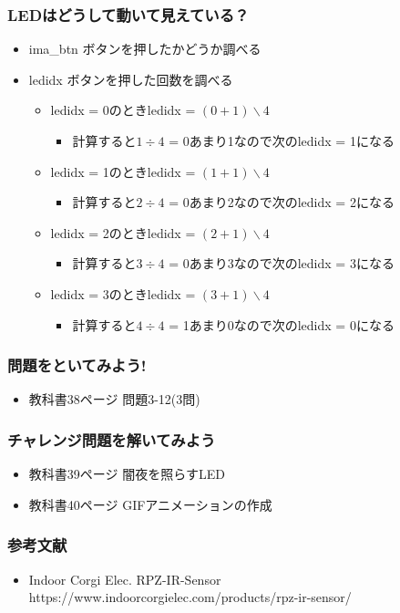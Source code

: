 \begin{frame}
  \frametitle{LEDはどうして動いて見えている？}
  \begin{itemize}
    \item ima\_btn ボタンを押したかどうか調べる
    \item ledidx ボタンを押した回数を調べる
    \begin{itemize}
      \item ledidx = 0のときledidx = $(0+1)\backslash4$
      \begin{itemize}
        \item 計算すると$1\div4$ = 0あまり1なので次のledidx = 1になる
      \end{itemize}
      \item ledidx = 1のときledidx = $(1+1)\backslash4$ 
      \begin{itemize}
        \item 計算すると$2\div4$ = 0あまり2なので次のledidx = 2になる 
      \end{itemize}
      \item ledidx = 2のときledidx = $(2+1)\backslash4$ 
      \begin{itemize}
        \item 計算すると$3\div4$ = 0あまり3なので次のledidx = 3になる
      \end{itemize}
      \item ledidx = 3のときledidx = $(3+1)\backslash4$ 
      \begin{itemize}
        \item 計算すると$4\div4$ = 1あまり0なので次のledidx = 0になる
      \end{itemize}
    \end{itemize}
  \end{itemize}
\end{frame}

\begin{frame}
  \frametitle{問題をといてみよう!}
  \begin{itemize}
    \item 教科書38ページ 問題3-12(3問)
  \end{itemize}
\end{frame}

\begin{frame}
  \frametitle{チャレンジ問題を解いてみよう}
  \begin{itemize}
    \item 教科書39ページ 闇夜を照らすLED
    \item 教科書40ページ GIFアニメーションの作成
  \end{itemize}
\end{frame}

\begin{frame}
  \frametitle{参考文献}
  \begin{itemize}
  \item Indoor Corgi Elec. RPZ-IR-Sensor https://www.indoorcorgielec.com/products/rpz-ir-sensor/
  \end{itemize}
\end{frame}